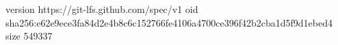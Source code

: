 version https://git-lfs.github.com/spec/v1
oid sha256:e62e9ece3fa84d2e4b8c6c152766fe4106a4700ce396f42b2cba1d5f9d1ebed4
size 549337
